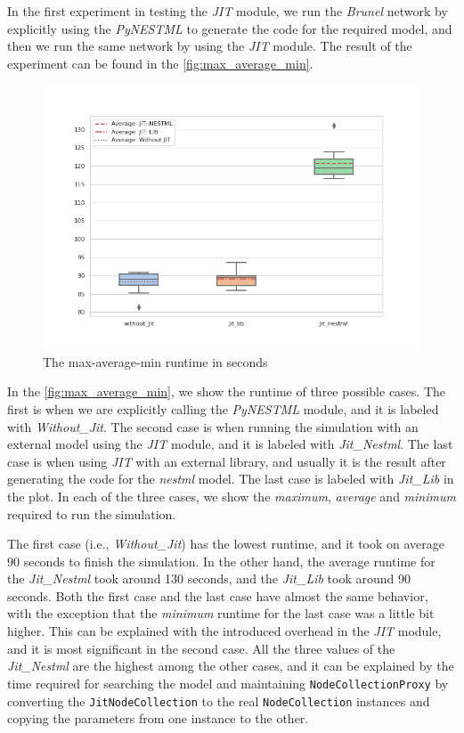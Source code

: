 In the first experiment in testing the \emph{JIT} module, we run the \emph{Brunel} network by explicitly using the \emph{PyNESTML} to generate the code for the required model, and then we run the same network by using the \emph{JIT} module. The result of the experiment can be found in the \autoref{fig:max_average_min}.

\begin{figure}[ht!]
    \centering
    \includegraphics[width=\textwidth]{src/pic/box_plot_three.png}
    \caption{The max-average-min runtime in seconds}
    \label{fig:max_average_min}
\end{figure}

In the \autoref{fig:max_average_min}, we show the runtime of three possible cases. The first is when we are explicitly calling the \emph{PyNESTML} module, and it is labeled with \emph{Without\_Jit}. The second case is when running the simulation with an external model using the \emph{JIT} module, and it is labeled with \emph{Jit\_Nestml}. The last case is when using \emph{JIT} with an external library, and usually it is the result after generating the code for the \emph{nestml} model. The last case is labeled with \emph{Jit\_Lib} in the plot. In each of the three cases, we show the \emph{maximum}, \emph{average} and \emph{minimum} required to run the simulation.

The first case (i.e., \emph{Without\_Jit}) has the lowest runtime, and it took on average 90 seconds to finish the simulation. In the other hand, the average runtime for the \emph{Jit\_Nestml} took around 130 seconds, and the \emph{Jit\_Lib} took around 90 seconds.  Both the first case and the last case have almost the same behavior, with the exception that the \emph{minimum} runtime for the last case was a little bit higher. This can be explained with the introduced overhead in the \emph{JIT} module, and it is most significant in the second case. All the three values of the \emph{Jit\_Nestml} are the highest among the other cases, and it can be explained by the time required for searching the model and maintaining \texttt{NodeCollectionProxy} by converting the \texttt{JitNodeCollection} to the real \texttt{NodeCollection} instances and copying the parameters from one instance to the other.


